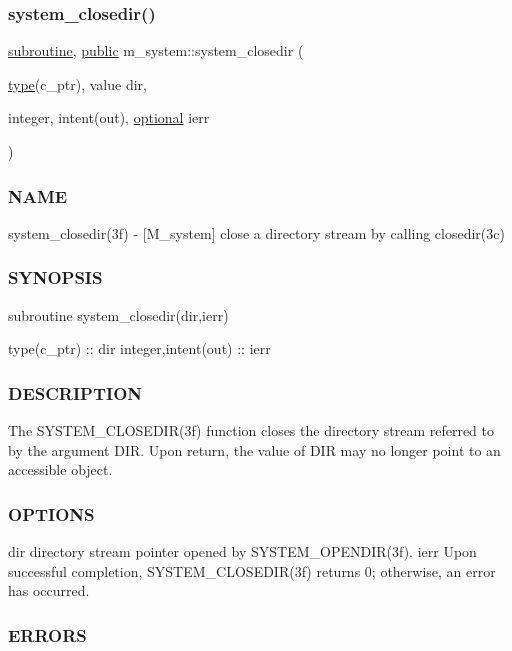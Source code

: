 \subsubsection{\texorpdfstring{system\+\_\+closedir()}{system\_closedir()}}
{\footnotesize\ttfamily \hyperlink{M__stopwatch_83_8txt_acfbcff50169d691ff02d4a123ed70482}{subroutine}, \hyperlink{M__stopwatch_83_8txt_a2f74811300c361e53b430611a7d1769f}{public} m\+\_\+system\+::system\+\_\+closedir (\begin{DoxyParamCaption}\item[{\hyperlink{stop__watch_83_8txt_a70f0ead91c32e25323c03265aa302c1c}{type}(c\+\_\+ptr), value}]{dir,  }\item[{integer, intent(out), \hyperlink{option__stopwatch_83_8txt_aa4ece75e7acf58a4843f70fe18c3ade5}{optional}}]{ierr }\end{DoxyParamCaption})}



\subsubsection*{N\+A\+ME}

system\+\_\+closedir(3f) -\/ \mbox{[}M\+\_\+system\mbox{]} close a directory stream by calling closedir(3c) \subsubsection*{S\+Y\+N\+O\+P\+S\+IS}

subroutine system\+\_\+closedir(dir,ierr)

type(c\+\_\+ptr) \+:\+: dir integer,intent(out) \+:\+: ierr \subsubsection*{D\+E\+S\+C\+R\+I\+P\+T\+I\+ON}

The S\+Y\+S\+T\+E\+M\+\_\+\+C\+L\+O\+S\+E\+D\+I\+R(3f) function closes the directory stream referred to by the argument D\+IR. Upon return, the value of D\+IR may no longer point to an accessible object. \subsubsection*{O\+P\+T\+I\+O\+NS}

dir directory stream pointer opened by S\+Y\+S\+T\+E\+M\+\_\+\+O\+P\+E\+N\+D\+I\+R(3f). ierr Upon successful completion, S\+Y\+S\+T\+E\+M\+\_\+\+C\+L\+O\+S\+E\+D\+I\+R(3f) returns 0; otherwise, an error has occurred. \subsubsection*{E\+R\+R\+O\+RS}

